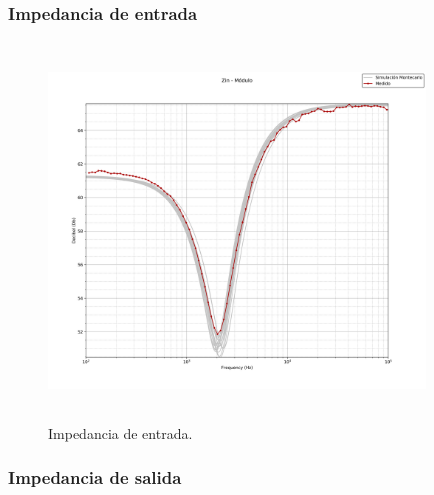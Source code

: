 \subsubsection{Impedancia de entrada}

\begin{figure}[H] %
	\centering
	\includegraphics[width=10cm,height=10cm,keepaspectratio]{../EJ1/00GRAFICOS/zin_modulo_sinTeorico.png}
	\caption{Impedancia de entrada.}
	\label{c1vinmax}
\end{figure}

\subsubsection{Impedancia de salida}